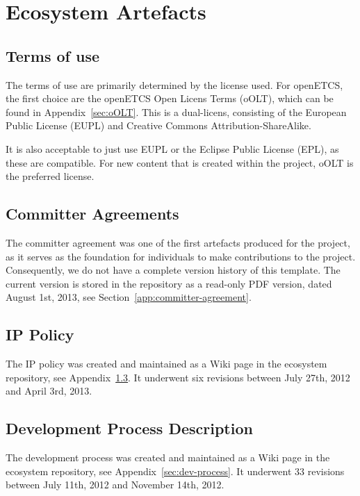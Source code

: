 \documentclass{template/openetcs_report}
\begin{document}
\chapter{Ecosystem Artefacts}


\section{Terms of use}
\label{sec:terms-of-use}

The terms of use are primarily determined by the license used.  For openETCS, the first choice are the openETCS Open Licens Terms (oOLT), which can be found in Appendix~\ref{sec:oOLT}. This is a dual-licens, consisting of the European Public License (EUPL) and Creative Commons Attribution-ShareAlike.

It is also acceptable to just use EUPL or the Eclipse Public License (EPL), as these are compatible. For new content that is created within the project, oOLT is the preferred license.

\section{Committer Agreements}
\label{sec:committer-agreements}

The committer agreement was one of the first artefacts produced for the project, as it serves as the foundation for individuals to make contributions to the project.  Consequently, we do not have a complete version history of this template.  The current version is stored in the repository as a read-only PDF version, dated August 1st, 2013, see Section~\ref{app:committer-agreement}.

\section{IP Policy}
\label{sec:ip-policy}

The IP policy was created and maintained as a Wiki page in the ecosystem repository, see Appendix~\ref{sec:ip-policy}.  It underwent six revisions between July 27th, 2012 and April 3rd, 2013.

\section{Development Process Description}
\label{sec:dev-process-description}

The development process was created and maintained as a Wiki page in the ecosystem repository, see Appendix~\ref{sec:dev-process}.  It underwent 33 revisions between July 11th, 2012 and November 14th, 2012.
\end{document}
